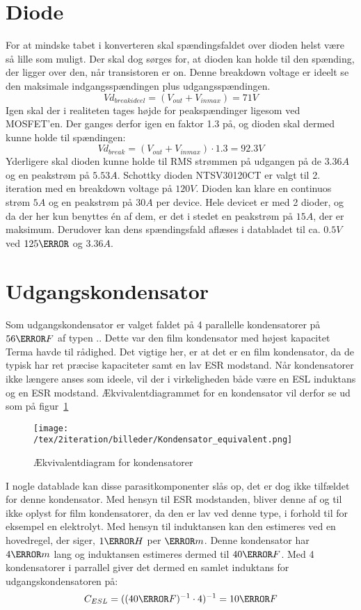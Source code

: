 \section{Diode}
For at mindske tabet i konverteren skal spændingsfaldet over dioden helst være så lille som muligt. Der skal dog sørges for, at dioden kan holde til den spænding, der ligger over den, når transistoren er on. Denne breakdown voltage er ideelt se den maksimale indgangsspændingen plus udgangsspændingen.
\begin{equation} \label{Vd_breakideel}
Vd_{breakideel} = (V_{out}+V_{inmax}) = 71V
\end{equation}
Igen skal der i realiteten tages højde for peakspændinger ligesom ved MOSFET'en. Der ganges derfor igen en faktor 1.3 på, og dioden skal dermed kunne holde til spændingen:
\begin{equation} \label{Vd_break}
Vd_{break} = (V_{out}+V_{inmax}) \cdot 1.3 = 92.3V
\end{equation}
Yderligere skal dioden kunne holde til RMS strømmen på udgangen på de $3.36A$ og en peakstrøm på $5.53A$.
Schottky dioden NTSV30120CT er valgt til 2. iteration med en breakdown voltage på $120V$. Dioden kan klare en continuos strøm $5A$ og en peakstrøm på $30A$ per device. Hele devicet er med 2 dioder, og da der her kun benyttes én af dem, er det i stedet en peakstrøm på $15A$, der er maksimum. Derudover kan dens spændingsfald aflæses i databladet til ca. $0.5V$ ved $125\degreeCelsius$ og $3.36A$. 

\section{Udgangskondensator}
Som udgangskondensator er valget faldet på 4 parallelle kondensatorer på $56\micro F$ af typen .. Dette var den film kondensator med højest kapacitet Terma havde til rådighed. Det vigtige her, er at det er en film kondensator, da de typisk har ret præcise kapaciteter samt en lav ESR modstand. Når kondensatorer ikke længere anses som ideele, vil der i virkeligheden både være en ESL induktans og en ESR modstand. Ækvivalentdiagrammet for en kondensator vil derfor se ud som på figur~\ref{fig: con_equi} 
\begin{figure}[H]
	\center
	\texttt{[image: /tex/2iteration/billeder/Kondensator\_equivalent.png]}
	\caption{Ækvivalentdiagram for kondensatorer}
	\label{fig: con_equi}
\end{figure}
I nogle datablade kan disse parasitkomponenter slås op, det er dog ikke tilfældet for denne kondensator. Med hensyn til ESR modstanden, bliver denne af og til ikke oplyst for film kondensatorer, da den er lav ved denne type, i forhold til for eksempel en elektrolyt. 
Med hensyn til induktansen kan den estimeres ved en hovedregel, der siger, $1\nano H$ per $\milli m$. Denne kondensator har $4\centi m$ lang og induktansen estimeres dermed til $40\nano F$. Med 4 kondensatorer i parrallel giver det dermed en samlet induktans for udgangskondensatoren på:
\begin{equation} \label{ESL}
C_{ESL} = ((40\nano F)^{-1} \cdot 4)^{-1} = 10\nano F
\end{equation}

